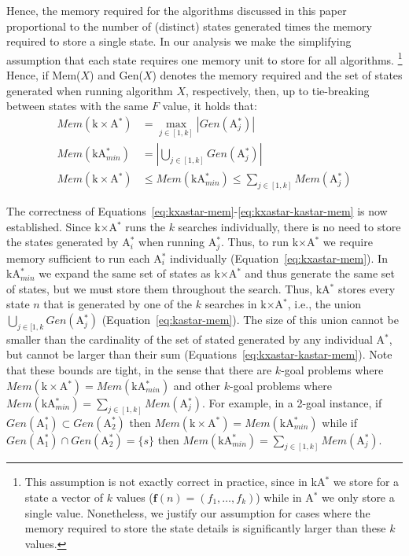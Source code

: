 \documentclass{aicom2e}
\newcommand{\astar}{A$^*$}
\newcommand{\kastar}{kA$^*$}
\newcommand{\kastarmin}{kA$^*_{min}$}
\newcommand{\kxastar}{k$\times$A$^*$}
\newcommand{\astari}[1]{A$^*_#1$}
\begin{document}
Hence, the memory required for the algorithms discussed in this paper
proportional to the number of (distinct) states generated times the memory
required to store a single state.
In our analysis we make the simplifying assumption that each state requires one
memory unit to store for all algorithms. \footnote{This assumption is not
exactly correct in practice, since in \kastar{} we store for a state a vector
of $k$ values ($\textbf{f}(n)=(f_1,\ldots,f_k)$)  while in \astar{} we only
store a single value. Nonetheless, we justify our assumption for cases where
the memory required to store the state details is significantly larger than
these $k$ values.} Hence, if Mem($X$) and Gen($X$) denotes the memory required
and the set of states generated when running algorithm $X$, respectively, then, up to tie-breaking between states with the same $F$ value, it holds that:
\begin{align}
Mem(\text{\kxastar{}})&=\max_{j\in [1,k]}| Gen(\text{\astari{j}})| \label{eq:kxastar-mem}\\
Mem(\text{\kastarmin{}})&=|\bigcup_{j\in [1,k]} Gen(\text{\astari{j}})| \label{eq:kastar-mem}\\
Mem(\text{\kxastar{}})&\leq Mem(\text{\kastarmin{}}) \leq \sum_{j\in[1,k]} Mem(\text{\astari{j}}) \label{eq:kxastar-kastar-mem}
\end{align}

The correctness of Equations~\ref{eq:kxastar-mem}-\ref{eq:kxastar-kastar-mem}
is now established. Since \kxastar{} runs the $k$ searches individually, there is
no need to store the states generated by \astari{i} when running \astari{j}.
Thus, to run \kxastar{} we require memory sufficient to run each \astari{i}
individually (Equation~\ref{eq:kxastar-mem}). In \kastarmin{} we expand the
same set of states as \kxastar{} and thus generate the same set of states, but
we must store them throughout the search. Thus, \kastar{} stores every state
$n$ that is  generated by one of the $k$ searches in \kxastar{}, i.e., the
union $\bigcup_{j\in[1,k}Gen(\text{\astari{j}})$
(Equation~\ref{eq:kastar-mem}). The size of this union cannot be smaller than
the cardinality of the set of stated generated by any individual \astar{}, but
cannot be larger than their sum (Equations~\ref{eq:kxastar-kastar-mem}). Note
that these bounds are tight, in the sense that there are $k$-goal problems
where $Mem(\text{\kxastar{}}) = Mem(\text{\kastarmin{}})$ and other $k$-goal
problems where $Mem(\text{\kastarmin{}}) = \sum_{j\in[1,k]}
Mem(\text{\astari{j}})$. For example, in a 2-goal instance,
if $Gen(\text{\astari{1}})\subset Gen(\text{\astari{2}})$ then
$Mem(\text{\kxastar{}}) = Mem(\text{\kastarmin{}})$
while if $Gen(\text{\astari{1}})\cap Gen(\text{\astari{2}})=\{s\}$ then
$Mem(\text{\kastarmin{}}) = \sum_{j\in[1,k]}
Mem(\text{\astari{j}})$.
\end{document}
